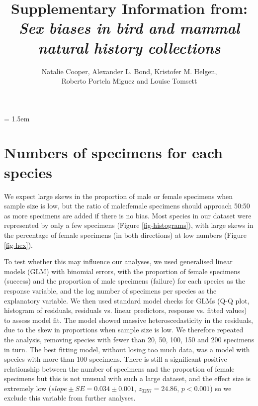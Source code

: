 \documentclass[a4paper, 12pt]{article}
\title{Supplementary Information from: \textit{Sex biases in bird and mammal natural history collections}}
\author{Natalie Cooper, 
  Alexander L. Bond,
  Kristofer M. Helgen,\\
  Roberto Portela Miguez and
  Louise Tomsett}
\date{}
\begin{document}
\maketitle

\tableofcontents

\parindent = 1.5em
\addtolength{\parskip}{.3em}


\newpage
\section{Numbers of specimens for each species}

We expect large skews in the proportion of male or female specimens when sample size is low, but the ratio of male:female specimens should approach 50:50 as more specimens are added if there is no bias. 
Most species in our dataset were represented by only a few specimens (Figure \ref{fig-histograms}), with large skews in the percentage of female specimens (in both directions) at low numbers (Figure \ref{fig-hex}).

To test whether this may influence our analyses, we used generalised linear models (GLM) with binomial errors, with the proportion of female specimens (success) and the proportion of male specimens (failure) for each species as the response variable, and the log number of specimens per species as the explanatory variable. 
We then used standard model checks for GLMs (Q-Q plot, histogram of residuals, residuals vs. linear predictors, response vs. fitted values) to assess model fit. 
The model showed massive heteroscedasticity in the residuals, due to the skew in proportions when sample size is low. 
We therefore repeated the analysis, removing species with fewer than 20, 50, 100, 150 and 200 specimens in turn. 
The best fitting model, without losing too much data, was a model with species with more than 100 specimens. 
There is still a significant positive relationship between the number of specimens and the proportion of female specimens but this is not unusual with such a large dataset, and the effect size is extremely low ($slope \pm SE = 0.034 \pm 0.001$, $z_3257 = 24.86$, $p < 0.001$) so we exclude this variable from further analyses.
\end{document}
